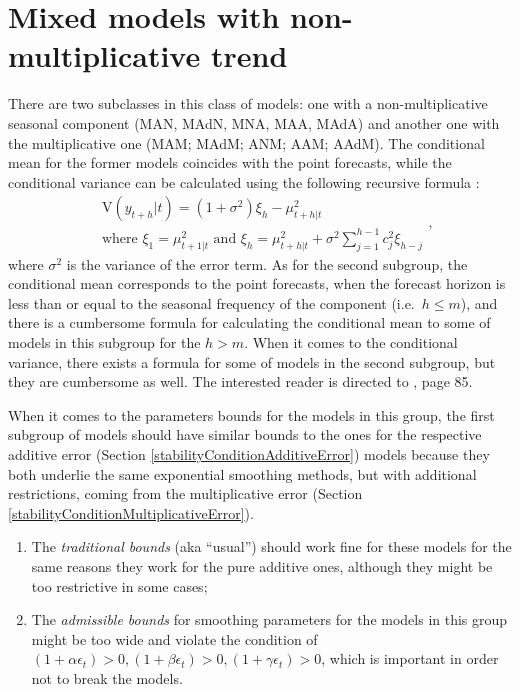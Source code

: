 \documentclass[
]{book}
\providecommand{\tightlist}{%
  \setlength{\itemsep}{0pt}\setlength{\parskip}{0pt}}
\theoremstyle{definition}
\theoremstyle{definition}
\theoremstyle{definition}
\theoremstyle{definition}
\theoremstyle{remark}
\begin{document}
\hypertarget{ADAMETSMixedModelsGroup3}{%
\section{Mixed models with non-multiplicative trend}\label{ADAMETSMixedModelsGroup3}}

There are two subclasses in this class of models: one with a non-multiplicative seasonal component (MAN, MAdN, MNA, MAA, MAdA) and another one with the multiplicative one (MAM; MAdM; ANM; AAM; AAdM). The conditional mean for the former models coincides with the point forecasts, while the conditional variance can be calculated using the following recursive formula \citep[page 84]{Hyndman2008b}:
\begin{equation}
    \begin{aligned}
    & \text{V}(y_{t+h}|t) = (1+\sigma^2) \xi_h -\mu_{t+h|t}^2 \\
    & \text{where } \xi_{1} = \mu_{t+1|t}^2 \text{ and } \xi_h = \mu_{t+h|t}^2 + \sigma^2 \sum_{j=1}^{h-1} c_{j}^2 \xi_{h-j}
    \end{aligned} ,
    \label{eq:ETSADAMMixedModels31Variance}
\end{equation}
where \(\sigma^2\) is the variance of the error term. As for the second subgroup, the conditional mean corresponds to the point forecasts, when the forecast horizon is less than or equal to the seasonal frequency of the component (i.e.~\(h\leq m\)), and there is a cumbersome formula for calculating the conditional mean to some of models in this subgroup for the \(h>m\). When it comes to the conditional variance, there exists a formula for some of models in the second subgroup, but they are cumbersome as well. The interested reader is directed to \citet{Hyndman2008b}, page 85.

When it comes to the parameters bounds for the models in this group, the first subgroup of models should have similar bounds to the ones for the respective additive error (Section \ref{stabilityConditionAdditiveError}) models because they both underlie the same exponential smoothing methods, but with additional restrictions, coming from the multiplicative error (Section \ref{stabilityConditionMultiplicativeError}).

\begin{enumerate}
\def\labelenumi{\arabic{enumi}.}
\tightlist
\item
  The \emph{traditional bounds} (aka ``usual'') should work fine for these models for the same reasons they work for the pure additive ones, although they might be too restrictive in some cases;
\item
  The \emph{admissible bounds} for smoothing parameters for the models in this group might be too wide and violate the condition of \((1+ \alpha \epsilon_t)>0, (1+ \beta \epsilon_t)>0, (1+ \gamma \epsilon_t)>0\), which is important in order not to break the models.
\end{enumerate}
\end{document}
